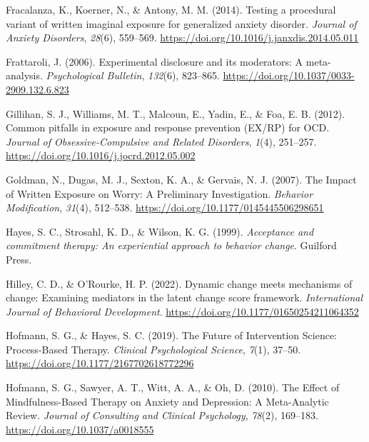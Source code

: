 \documentclass[
  man,floatsintext]{apa7}
\newlength{\cslhangindent}
\newlength{\cslentryspacingunit} %
\newenvironment{CSLReferences}[2] %
 {%
  \setlength{\parindent}{0pt}
  \ifodd #1
  \let\oldpar\par
  \def\par{\hangindent=\cslhangindent\oldpar}
  \fi
  \setlength{\parskip}{#2\cslentryspacingunit}
 }%
 {}
\begin{document}
\begin{CSLReferences}{1}{0}
\leavevmode{}%
Fracalanza, K., Koerner, N., \& Antony, M. M. (2014). Testing a procedural variant of written imaginal exposure for generalized anxiety disorder. \emph{Journal of Anxiety Disorders}, \emph{28}(6), 559--569. \url{https://doi.org/10.1016/j.janxdis.2014.05.011}

\leavevmode{}%
Frattaroli, J. (2006). Experimental disclosure and its moderators: A meta-analysis. \emph{Psychological Bulletin}, \emph{132}(6), 823--865. \url{https://doi.org/10.1037/0033-2909.132.6.823}

\leavevmode{}%
Gillihan, S. J., Williams, M. T., Malcoun, E., Yadin, E., \& Foa, E. B. (2012). Common pitfalls in exposure and response prevention (EX/RP) for OCD. \emph{Journal of Obsessive-Compulsive and Related Disorders}, \emph{1}(4), 251--257. \url{https://doi.org/10.1016/j.jocrd.2012.05.002}

\leavevmode{}%
Goldman, N., Dugas, M. J., Sexton, K. A., \& Gervais, N. J. (2007). The Impact of Written Exposure on Worry: A Preliminary Investigation. \emph{Behavior Modification}, \emph{31}(4), 512--538. \url{https://doi.org/10.1177/0145445506298651}

\leavevmode{}%
Hayes, S. C., Strosahl, K. D., \& Wilson, K. G. (1999). \emph{Acceptance and commitment therapy: An experiential approach to behavior change}. Guilford Press.

\leavevmode{}%
Hilley, C. D., \& O'Rourke, H. P. (2022). Dynamic change meets mechanisms of change: Examining mediators in the latent change score framework. \emph{International Journal of Behavioral Development}. \url{https://doi.org/10.1177/01650254211064352}

\leavevmode{}%
Hofmann, S. G., \& Hayes, S. C. (2019). The Future of Intervention Science: Process-Based Therapy. \emph{Clinical Psychological Science}, \emph{7}(1), 37--50. \url{https://doi.org/10.1177/2167702618772296}

\leavevmode{}%
Hofmann, S. G., Sawyer, A. T., Witt, A. A., \& Oh, D. (2010). The Effect of Mindfulness-Based Therapy on Anxiety and Depression: A Meta-Analytic Review. \emph{Journal of Consulting and Clinical Psychology}, \emph{78}(2), 169--183. \url{https://doi.org/10.1037/a0018555}


\end{CSLReferences}
\end{document}
